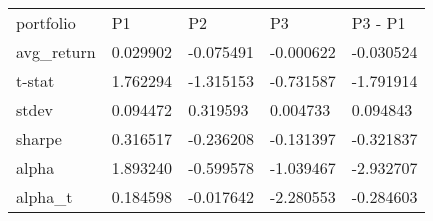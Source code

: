\begin{tabular}{lllll}
\toprule
\midrule
portfolio & P1 & P2 & P3 & P3 - P1 \\
avg_return & 0.029902 & -0.075491 & -0.000622 & -0.030524 \\
t-stat & 1.762294 & -1.315153 & -0.731587 & -1.791914 \\
stdev & 0.094472 & 0.319593 & 0.004733 & 0.094843 \\
sharpe & 0.316517 & -0.236208 & -0.131397 & -0.321837 \\
alpha & 1.893240 & -0.599578 & -1.039467 & -2.932707 \\
alpha_t & 0.184598 & -0.017642 & -2.280553 & -0.284603 \\
\bottomrule
\end{tabular}
